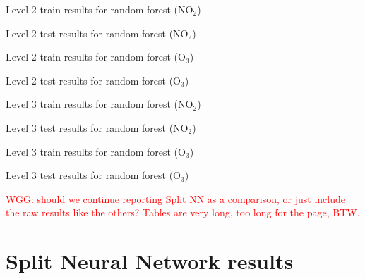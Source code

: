 \documentclass[journal abbreviation, manuscript]{copernicus}
\newcommand\todo[1]{\textcolor{red}{#1}}
\newcommand{\textus}[1]{$_{\text{#1}}$}
\begin{document}
\begin{table}[H]
\centering
\scriptsize

\caption{Level 2 train results for random forest (NO\textus{2})}
\end{table}
\begin{table}[H]
\centering
\scriptsize

\caption{Level 2 test results for random forest (NO\textus{2})}
\end{table}

\begin{table}[H]
\centering
\scriptsize

\caption{Level 2 train results for random forest (O\textus{3})}
\end{table}
\begin{table}[H]
\centering
\scriptsize

\caption{Level 2 test results for random forest (O\textus{3})}
\end{table}

\begin{table}[H]
\centering
\scriptsize

\caption{Level 3 train results for random forest (NO\textus{2})}
\end{table}
\begin{table}[H]
\centering
\scriptsize

\caption{Level 3 test results for random forest (NO\textus{2})}
\end{table}

\begin{table}[H]
\centering
\scriptsize

\caption{Level 3 train results for random forest (O\textus{3})}
\end{table}
\begin{table}[H]
\centering
\scriptsize

\caption{Level 3 test results for random forest (O\textus{3})}
\end{table}


\todo{WGG: should we continue reporting Split NN as a comparison, or just include the raw results like the others?  Tables are very long, too long for the page, BTW.}
\section{Split Neural Network results}


\end{document}
